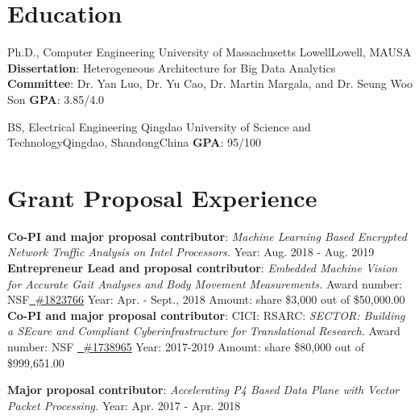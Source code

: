 \documentclass[11pt]{moderncv}
\begin{document}
\section{Education}
        {Ph.D., Computer Engineering}
        {University of Massachusetts Lowell}{Lowell, MA}{USA}
        {\textbf{Dissertation}: Heterogeneous Architecture for Big Data Analytics\\
         \textbf{Committee}: Dr. Yan Luo, Dr. Yu Cao, Dr. Martin Margala, and Dr. Seung Woo Son
         \textbf{GPA}: 3.85/4.0}  %

        {BS, Electrical Engineering}
        {Qingdao University of Science and Technology}{Qingdao, Shandong}{China}
        {\textbf{GPA}: 95/100        
        }

\section{Grant Proposal Experience}

%
{\textbf{Co-PI and major proposal contributor}: \textit{Machine Learning Based Encrypted Network Traffic Analysis on Intel Processors.} \newline
Year: Aug. 2018 - Aug. 2019
}
%
{\textbf{Entrepreneur Lead and proposal contributor}: \textit{Embedded Machine Vision for Accurate Gait Analyses and Body Movement Measurements.} \newline
Award number: NSF\href{https://nsf.gov/awardsearch/showAward?AWD_ID=1823766}
  {\color{color2}\homepagesymbol~\#1823766} \newline
Year: Apr. - Sept., 2018 \newline
Amount: share \$3,000 out of \$50,000.00
}
%
{\textbf{Co-PI and major proposal contributor}: CICI: RSARC: \textit{SECTOR: Building a {SE}cure and Compliant {C}yberinfrastructure for {T}ranslati{o}nal {R}esearch.} \newline
Award number: NSF \href{https://nsf.gov/awardsearch/showAward?AWD_ID=1738965}
  {\color{color2}\homepagesymbol~\#1738965} \newline
Year: 2017-2019 \newline
Amount: share \$80,000 out of \$999,651.00
}

%
{\textbf{Major proposal contributor}: \textit{Accelerating P4 Based Data Plane with Vector Packet Processing.} \newline
Year: Apr. 2017 - Apr. 2018
}
\end{document}
